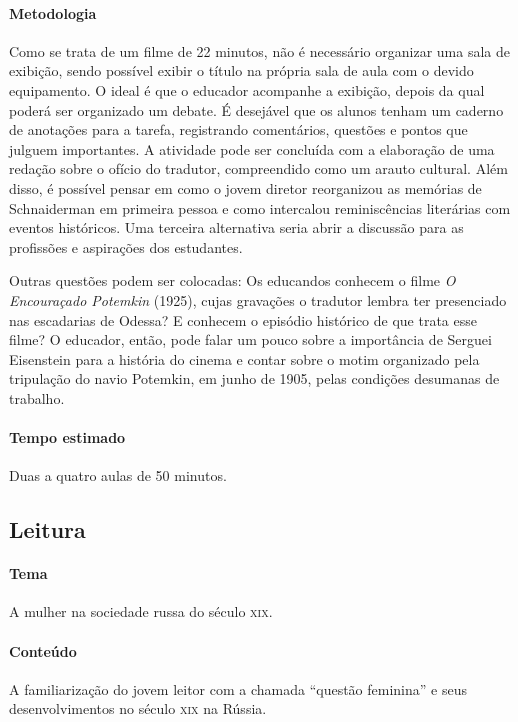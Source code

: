 \documentclass{article}
\begin{document}
\paragraph{Metodologia}
Como se trata de um filme de 22 minutos, não é necessário organizar uma
sala de exibição, sendo possível exibir o título na própria sala de aula
com o devido equipamento. O ideal é que o educador acompanhe a exibição,
depois da qual poderá ser organizado um debate. É desejável que os
alunos tenham um caderno de anotações para a tarefa, registrando
comentários, questões e pontos que julguem importantes. A atividade pode
ser concluída com a elaboração de uma redação sobre o ofício do
tradutor, compreendido como um arauto cultural. Além disso, é possível
pensar em como o jovem diretor reorganizou as memórias de Schnaiderman
em primeira pessoa e como intercalou reminiscências literárias com
eventos históricos. Uma terceira alternativa seria abrir a discussão
para as profissões e aspirações dos estudantes.

Outras questões podem ser colocadas: Os educandos conhecem o filme
\emph{O Encouraçado Potemkin} (1925), cujas gravações o tradutor lembra
ter presenciado nas escadarias de Odessa? E conhecem o episódio
histórico de que trata esse filme? O educador, então, pode falar um
pouco sobre a importância de Serguei Eisenstein para a história do
cinema e contar sobre o motim organizado pela tripulação do navio
Potemkin, em junho de 1905, pelas condições desumanas de trabalho.

\paragraph{Tempo estimado} Duas a quatro aulas de 50 minutos.


\subsection{Leitura}

\paragraph{Tema} A mulher na sociedade russa do século \textsc{xix}.


\bnccativividadesleitura
{}

\paragraph{Conteúdo}
A familiarização do jovem leitor com a chamada ``questão feminina'' e
seus desenvolvimentos no século \textsc{xix} na Rússia.
\end{document}
